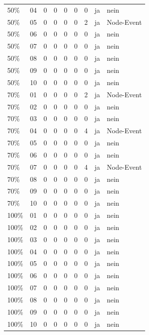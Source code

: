 \begin{longtable}{llrrrrrll}
50\% & 04 & 0 & 0 & 0 & 0 & 0 & ja & nein \\
50\% & 05 & 0 & 0 & 0 & 0 & 2 & ja & Node-Event \\
50\% & 06 & 0 & 0 & 0 & 0 & 0 & ja & nein \\
50\% & 07 & 0 & 0 & 0 & 0 & 0 & ja & nein \\
50\% & 08 & 0 & 0 & 0 & 0 & 0 & ja & nein \\
50\% & 09 & 0 & 0 & 0 & 0 & 0 & ja & nein \\
50\% & 10 & 0 & 0 & 0 & 0 & 0 & ja & nein \\
70\% & 01 & 0 & 0 & 0 & 0 & 2 & ja & Node-Event \\
70\% & 02 & 0 & 0 & 0 & 0 & 0 & ja & nein \\
70\% & 03 & 0 & 0 & 0 & 0 & 0 & ja & nein \\
70\% & 04 & 0 & 0 & 0 & 0 & 4 & ja & Node-Event \\
70\% & 05 & 0 & 0 & 0 & 0 & 0 & ja & nein \\
70\% & 06 & 0 & 0 & 0 & 0 & 0 & ja & nein \\
70\% & 07 & 0 & 0 & 0 & 0 & 4 & ja & Node-Event \\
70\% & 08 & 0 & 0 & 0 & 0 & 0 & ja & nein \\
70\% & 09 & 0 & 0 & 0 & 0 & 0 & ja & nein \\
70\% & 10 & 0 & 0 & 0 & 0 & 0 & ja & nein \\
100\% & 01 & 0 & 0 & 0 & 0 & 0 & ja & nein \\
100\% & 02 & 0 & 0 & 0 & 0 & 0 & ja & nein \\
100\% & 03 & 0 & 0 & 0 & 0 & 0 & ja & nein \\
100\% & 04 & 0 & 0 & 0 & 0 & 0 & ja & nein \\
100\% & 05 & 0 & 0 & 0 & 0 & 0 & ja & nein \\
100\% & 06 & 0 & 0 & 0 & 0 & 0 & ja & nein \\
100\% & 07 & 0 & 0 & 0 & 0 & 0 & ja & nein \\
100\% & 08 & 0 & 0 & 0 & 0 & 0 & ja & nein \\
100\% & 09 & 0 & 0 & 0 & 0 & 0 & ja & nein \\
100\% & 10 & 0 & 0 & 0 & 0 & 0 & ja & nein \\
\bottomrule
\end{longtable}
